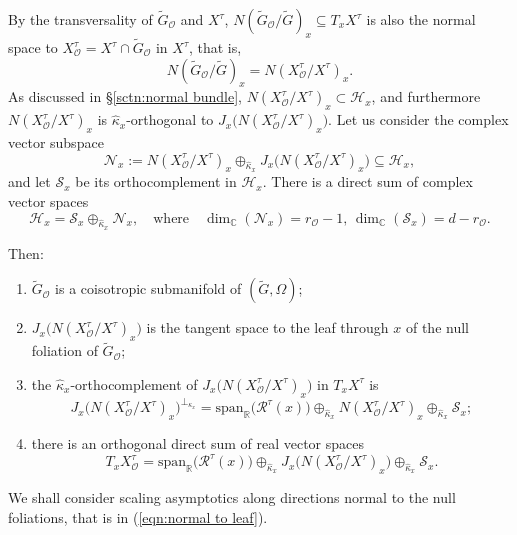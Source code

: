 \documentclass[12pt,a4paper]{article}
\theoremstyle{plain}
\theoremstyle{definition}
\begin{document}
By the transversality of $\tilde{G}_{\mathcal{O}}$ and $X^\tau$, $N(\tilde{G}_{\mathcal{O}}/\tilde{G})_x\subseteq T_xX^\tau$
is also the normal space to 
$X^\tau_{\mathcal{O}}=X^\tau\cap \tilde{G}_{\mathcal{O}}$ in $X^\tau$, that is, 
$$
N(\tilde{G}_{\mathcal{O}}/\tilde{G})_x=
N(X^\tau_{\mathcal{O}}/X^\tau)_x.$$
%
As discussed in \S \ref{sctn:normal bundle}, 
$N(X^\tau_{\mathcal{O}}/X^\tau)_x\subset \mathcal{H}_x$, and 
furthermore $N(X^\tau_{\mathcal{O}}/X^\tau)_x$ is $\hat{\kappa}_x$-orthogonal
to $J_x\big(N(X^\tau_{\mathcal{O}}/X^\tau)_x \big)$.
Let us consider the complex vector subspace
%
\begin{equation}
\label{eqn:direct sum Nx}
\mathcal{N}_x:=
N(X^\tau_{\mathcal{O}}/X^\tau)_x\oplus_{\hat{\kappa}_x} J_x\big(N(X^\tau_{\mathcal{O}}/X^\tau)_x\big)\subseteq \mathcal{H}_x,
\end{equation}
%
and let  $\mathcal{S}_x$
be its orthocomplement in $\mathcal{H}_x$. There 
is a direct sum of complex vector spaces
\begin{equation}
\label{eqn:dsdecomp HSN}
\mathcal{H}_x=\mathcal{S}_x\oplus_{\hat{\kappa}_x}\mathcal{N}_x,
\quad\text{where}
\quad \dim_{\mathbb{C}}(\mathcal{N}_x)=r_{\mathcal{O}}-1,\,
\dim_{\mathbb{C}}(\mathcal{S}_x)=d-r_{\mathcal{O}}.
\end{equation}

Then:
\begin{enumerate}
\item $\tilde{G}_{\mathcal{O}}$ is a coisotropic submanifold 
of $(\tilde{G},\Omega)$;
\item $J_x\big(N(X^\tau_{\mathcal{O}}/X^\tau)_x\big)$ 
is the tangent space to the leaf 
through $x$ of the null foliation of
$\tilde{G}_{\mathcal{O}}$;
\item the $\hat{\kappa}_x$-orthocomplement
of $J_x\big(N(X^\tau_{\mathcal{O}}/X^\tau)_x\big)$
in $T_xX^\tau$ is
\begin{equation}
\label{eqn:normal to leaf}
J_x\big(N(X^\tau_{\mathcal{O}}/X^\tau)_x\big)^{\perp_{\kappa_x}}
=\mathrm{span}_{\mathbb{R}}\big(\mathcal{R}^\tau(x)\big)
\oplus_{\hat{\kappa}_x}
N(X^\tau_{\mathcal{O}}/X^\tau)_x \oplus_{\hat{\kappa}_x}\mathcal{S}_x;
\end{equation}
%
\item there is an orthogonal direct sum of real vector spaces
\begin{equation}
\label{eqn:direct sum decmp TxX}
T_xX^\tau_{\mathcal{O}}=
\mathrm{span}_{\mathbb{R}}\big(\mathcal{R}^\tau(x)\big)
\oplus _{\hat{\kappa}_x}
J_x\big(N(X^\tau_{\mathcal{O}}/X^\tau)_x\big)\oplus_{\hat{\kappa}_x}
\mathcal{S}_x.
\end{equation}

\end{enumerate}
%
We shall consider scaling asymptotics along directions normal to
the null foliations, that is in (\ref{eqn:normal to leaf}).
\end{document}
